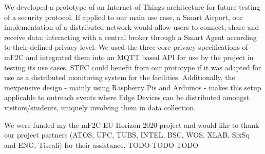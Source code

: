 We developed a prototype of an Internet of Things architecture for future testing of a security protocol. If applied to our main use case, a Smart Airport, our implementation of a distributed network would allow users to connect, share and receive data; interacting with a central broker through a Smart Agent according to their defined privacy level. We used the three core privacy specifications of mF2C and integrated them into an MQTT based API for use by the project in testing its use cases. STFC could benefit from our prototype if it was adapted for use as a distributed monitoring system for the facilities. Additionally, the inexpensive design - mainly using Raspberry Pis and Arduinos - makes this setup applicable to outreach events where Edge Devices can be distributed amongst visitors/students, uniquely involving them in data collection.

We were funded my the mF2C EU Horizon 2020 project and would like to thank our project partners (ATOS, UPC, TUBS, INTEL, BSC, WOS, XLAB, SixSq and ENG, Tiscali) for their assistance. TODO TODO TODO
